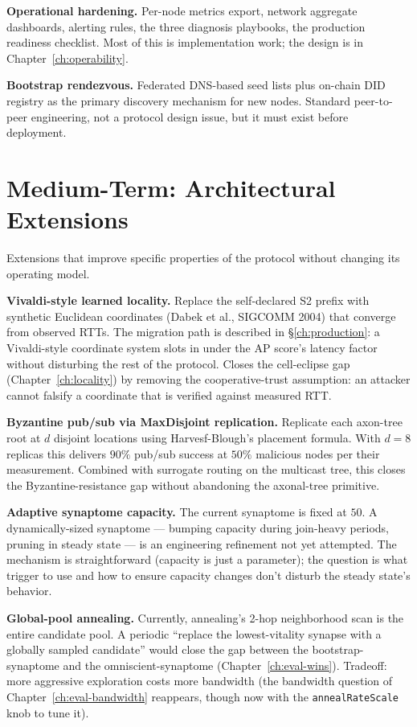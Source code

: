 \documentclass[twoside,nobib]{tufte-book}
\begin{document}
\textbf{Operational hardening.} Per-node metrics export, network
aggregate dashboards, alerting rules, the three diagnosis
playbooks, the production readiness checklist. Most of this is
implementation work; the design is in
Chapter~\ref{ch:operability}.

\textbf{Bootstrap rendezvous.} Federated DNS-based seed lists
plus on-chain DID registry as the primary discovery mechanism for
new nodes. Standard peer-to-peer engineering, not a protocol
design issue, but it must exist before deployment.

\section{Medium-Term: Architectural Extensions}

Extensions that improve specific properties of the protocol
without changing its operating model.

\textbf{Vivaldi-style learned locality.} Replace the
self-declared S2 prefix with synthetic Euclidean coordinates
(Dabek et al., SIGCOMM 2004) that converge from observed RTTs.
The migration path is described in
\S\ref{ch:production}: a Vivaldi-style coordinate system slots
in under the AP score's latency factor without disturbing the
rest of the protocol. Closes the cell-eclipse gap
(Chapter~\ref{ch:locality}) by removing the cooperative-trust
assumption: an attacker cannot falsify a coordinate that is
verified against measured RTT.

\textbf{Byzantine pub/sub via MaxDisjoint replication.}
Replicate each axon-tree root at $d$ disjoint locations using
Harvesf-Blough's placement formula. With $d = 8$ replicas this
delivers $90\%$ pub/sub success at $50\%$ malicious nodes per
their measurement. Combined with surrogate routing on the
multicast tree, this closes the Byzantine-resistance gap
without abandoning the axonal-tree primitive.

\textbf{Adaptive synaptome capacity.} The current synaptome is
fixed at $50$. A dynamically-sized synaptome --- bumping
capacity during join-heavy periods, pruning in steady state ---
is an engineering refinement not yet attempted. The mechanism
is straightforward (capacity is just a parameter); the question
is what trigger to use and how to ensure capacity changes don't
disturb the steady state's behavior.

\textbf{Global-pool annealing.} Currently, annealing's
2-hop neighborhood scan is the entire candidate pool. A
periodic ``replace the lowest-vitality synapse with a globally
sampled candidate'' would close the gap between the
bootstrap-synaptome and the omniscient-synaptome
(Chapter~\ref{ch:eval-wins}). Tradeoff: more aggressive
exploration costs more bandwidth (the bandwidth question of
Chapter~\ref{ch:eval-bandwidth} reappears, though now with the
\texttt{annealRateScale} knob to tune it).
\end{document}
